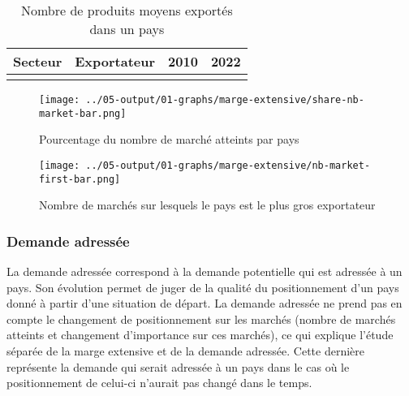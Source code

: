 \documentclass[french,10pt,a4paper]{article}
\begin{document}
\begin{table}[ht]
  \centering
  \begin{tabular}{lrrr}
    \hline
   Secteur & Exportateur & 2010 & 2022 \\
    \hline
    \\
    \hline
  \end{tabular}
  \caption{Nombre de produits moyens exportés dans un pays}
  \label{tab:table-nb-mean-product-export}
\end{table}

\begin{figure}[!h]
  \centering
  \texttt{[image: ../05-output/01-graphs/marge-extensive/share-nb-market-bar.png]}
  \caption{Pourcentage du nombre de marché atteints par pays}
  \label{fig:nb-market-bar}
\end{figure}

\begin{figure}[!h]
  \centering  \texttt{[image: ../05-output/01-graphs/marge-extensive/nb-market-first-bar.png]}
  \caption{Nombre de marchés sur lesquels le pays est le plus gros exportateur}
  \label{fig:nb-market-first-bar}
\end{figure}


\subsubsection{Demande adressée}
La demande adressée correspond à la demande potentielle qui est adressée à un pays. Son évolution permet de juger de la qualité du positionnement d'un pays donné à partir d'une situation de départ. La demande adressée ne prend pas en compte le changement de positionnement sur les marchés (nombre de marchés atteints et changement d'importance sur ces marchés), ce qui explique l'étude séparée de la marge extensive et de la demande adressée. Cette dernière représente la demande qui serait adressée à un pays dans le cas où le positionnement de celui-ci n'aurait pas changé dans le temps. 
\end{document}
